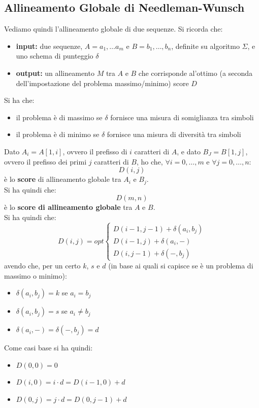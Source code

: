 \documentclass[a4paper,12pt, oneside]{book}
\begin{document}
\subsection{Allineamento Globale di Needleman-Wunsch}
Vediamo quindi l'allineamento globale di due sequenze. Si ricorda che:
\begin{itemize}
  \item \textbf{input:} due sequenze, $A=a_1,\ldots a_m$ e $B=b_1,\ldots,b_n$,
  definite su algoritmo $\Sigma$, e uno schema di punteggio $\delta$
  \item \textbf{output:} un allineamento $M$ tra $A$ e $B$ che corrisponde
  al'ottimo (a seconda dell'impostazione del problema massimo/minimo) score $D$
\end{itemize}
Si ha che:
\begin{itemize}
  \item il problema è di massimo se $\delta$ fornisce una misura di somiglianza
  tra simboli
  \item il problema è di minimo se $\delta$ fornisce una misura di diversità
  tra simboli
\end{itemize}
Dato $A_i=A[1,i]$, ovvero il prefisso di $i$ caratteri di $A$, e dato
$B_J=B[1,j]$, ovvero il prefisso dei primi $j$ caratteri di $B$, ho che,
$\forall i=0,\ldots,m$ e $\forall j=0,\ldots, n$:
\[D(i,j)\]
è lo \textbf{score} di allineamento globale tra $A_i$ e $B_j$. \\
Si ha quindi che:
\[D(m,n)\]
è lo \textbf{score di allineamento globale} tra $A$ e $B$.\\
Si ha quindi che:
\[D(i,j)=opt
  \begin{cases}
    D(i-1,j-1)+\delta(a_i,b_j)\\
    D(i-1,j)+\delta(a_i,-)\\
    D(i, j-1)+\delta(-,b_j)
  \end{cases}
\]
avendo che, per un certo $k$, $s$ e $d$ (in base ai quali si capisce se è un
problema di massimo o minimo):
\begin{itemize}
  \item $\delta(a_i,b_j)=k$ se $a_i=b_j$
  \item $\delta(a_i,b_j)=s$ se $a_i\neq b_j$
  \item $\delta(a_i,-)=\delta(-,b_j)=d$
\end{itemize}
Come casi base si ha quindi:
\begin{itemize}
  \item $D(0,0)=0$
  \item $D(i,0) = i\cdot d = D(i-1,0) + d $
  \item $D(0,j) = j\cdot d = D(0,j-1) + d $
\end{itemize}
\end{document}
